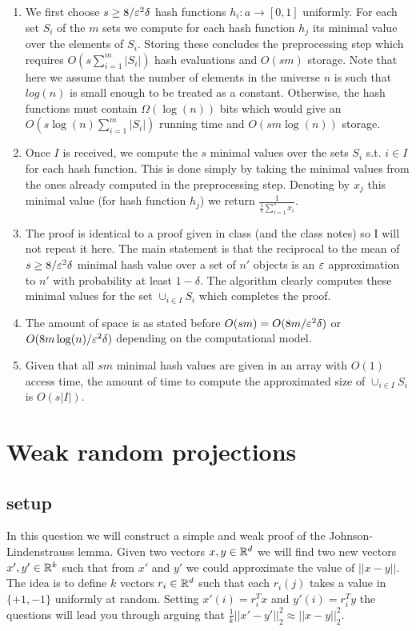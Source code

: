 \documentclass{article}
\begin{document}
\begin{enumerate}
\item We first choose $s \ge 8/\varepsilon^2\delta$ hash functions $h_i : a \rightarrow [0,1]$ uniformly.
For each set $S_i$ of the $m$ sets we compute for each hash function $h_j$ its minimal value over the elements of $S_i$.
Storing these concludes the preprocessing step which requires $O(s\sum_{i=1}^{m}|S_i|)$ hash evaluations and $O(sm)$ storage.
Note that here we assume that the number of elements in the universe $n$ is such that $log(n)$ is small enough to be treated as a constant.
Otherwise, the hash functions must contain $\Omega(\log(n))$ bits which would give an $O(s\log(n)\sum_{i=1}^{m}|S_i|)$ running time
and $O(sm\log(n))$ storage.

\item Once $I$ is received, we compute the $s$ minimal values over the sets $S_i$ s.t. $i \in I$ for each hash function.
This is done simply by taking the minimal values from the ones already computed in the preprocessing step. 
Denoting by $x_j$ this minimal value (for hash function $h_j$) we return $\frac{1}{\frac{1}{s}\sum_{i=1}^{s}x_i}$.
\item The proof is identical to a proof given in class (and the class notes) so I will not repeat it here.
The main statement is that the reciprocal to the mean of $s \ge 8/\varepsilon^2\delta$ minimal hash value over a set of $n'$ objects is
an $\varepsilon$ approximation to $n'$ with probability at least $1-\delta$.
The algorithm clearly computes these minimal values for the set $\cup_{i \in I}S_i$ which completes the proof.    
\item The amount of space is as stated before $O(sm) = O(8m/\varepsilon^2\delta)$ or $O(8m\log(n)/\varepsilon^2\delta)$ depending
on the computational model.
\item Given that all $sm$ minimal hash values are given in an array with $O(1)$ access time, the amount of time
to compute the approximated size of $\cup_{i \in I}S_i$ is $O(s|I|)$.
\end{enumerate}

\pagebreak


\section{Weak random projections}
\subsection*{setup}
In this question we will construct a simple and weak proof of the Johnson-Lindenstrauss lemma. 
Given two vectors $x,y \in{\mathbb{R}}^{d}$ we will find two new vectors $x',y'\in {\mathbb{R}}^{k}$ such that from $x'$ and
$y'$ we could approximate the value of $||x-y||$. The idea is to
define $k$ vectors $r_i \in {\mathbb{R}}^{d}$ such that each $r_i(j)$ takes a
value in $\{+1,-1\}$ uniformly at random. Setting $x'(i) =
r_{i}^{T}x$ and $y'(i) = r_{i}^{T}y$ the questions will lead you through arguing that
$\frac{1}{k}||x' -y'||_{2}^{2} \approx ||x-y||_{2}^{2}$.
\end{document}
